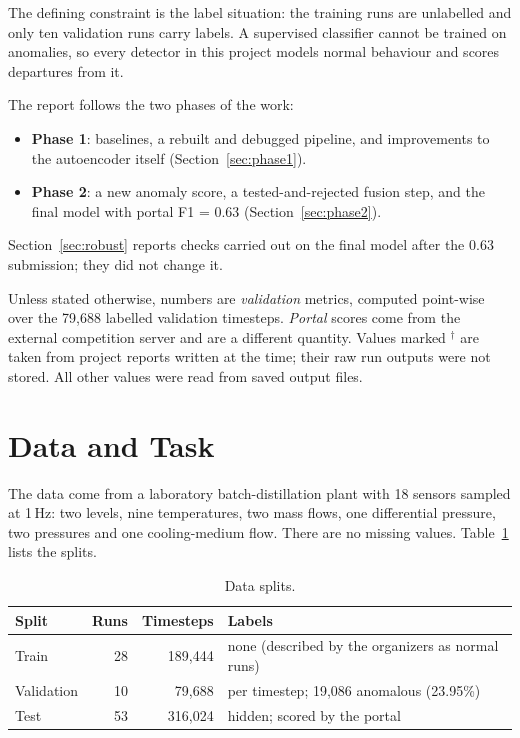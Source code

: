 \documentclass[runningheads]{llncs}
\newcommand{\doc}{$^\dagger$}
\begin{document}
The defining constraint is the label situation: the training runs are unlabelled and only ten validation runs carry labels. A supervised classifier cannot be trained on anomalies, so every detector in this project models normal behaviour and scores departures from it.

The report follows the two phases of the work:
\begin{itemize}
  \item \textbf{Phase 1}: baselines, a rebuilt and debugged pipeline, and improvements to the autoencoder itself (Section~\ref{sec:phase1}).
  \item \textbf{Phase 2}: a new anomaly score, a tested-and-rejected fusion step, and the final model with portal F1 = 0.63 (Section~\ref{sec:phase2}).
\end{itemize}
Section~\ref{sec:robust} reports checks carried out on the final model after the 0.63 submission; they did not change it.

Unless stated otherwise, numbers are \emph{validation} metrics, computed point-wise over the 79{,}688 labelled validation timesteps. \emph{Portal} scores come from the external competition server and are a different quantity. Values marked \doc{} are taken from project reports written at the time; their raw run outputs were not stored. All other values were read from saved output files.

\section{Data and Task}

The data come from a laboratory batch-distillation plant with 18 sensors sampled at 1\,Hz: two levels, nine temperatures, two mass flows, one differential pressure, two pressures and one cooling-medium flow. There are no missing values. Table~\ref{tab:data} lists the splits.

\begin{table}[ht]
\centering
\caption{Data splits.}\label{tab:data}
\begin{tabular}{|l|r|r|l|}
\hline
Split & Runs & Timesteps & Labels \\
\hline
Train & 28 & 189{,}444 & none (described by the organizers as normal runs) \\
Validation & 10 & 79{,}688 & per timestep; 19{,}086 anomalous (23.95\%) \\
Test & 53 & 316{,}024 & hidden; scored by the portal \\
\hline
\end{tabular}
\end{table}
\end{document}
